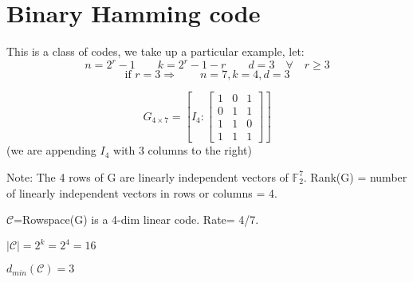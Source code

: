 \documentclass{article}
\begin{document}
\section{Binary Hamming code}

This is a class of codes, we take up a particular example, let:
$$ n=2^r -1 \qquad k=2^r-1-r \qquad d=3 \quad \forall \quad r \geq 3$$
$$ \text{if }r=3  \Rightarrow\qquad n=7,k=4,d=3$$

$$ G_{4 \times 7}= \left[ I_4 : \begin{bmatrix}
    1       & 0 & 1  \\
    0       & 1 & 1  \\
    1       & 1 & 0  \\
    1       & 1 & 1
\end{bmatrix}\right]$$
(we are appending $I_4$ with 3 columns to the right)

Note: The 4 rows of G are linearly independent vectors of $\mathbb{F}_2^7$. Rank(G) = number of linearly independent vectors in rows or columns = 4.

$\mathscr{C}$=Rowspace(G) is a 4-dim linear code. Rate= 4/7.

$|\mathscr{C}|= 2^k= 2^4=16$

$d_{min}(\mathscr{C}) =3$
\end{document}
